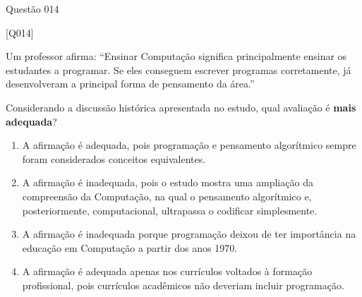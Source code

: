 \documentclass[xcolor=dvipsnames,table]{beamer}
\begin{document}
{\logo{}
\begin{frame}{Questão 014}

    \footnotesize

    \begin{block}{[Q014]}

    Um professor afirma: ``Ensinar Computação significa principalmente ensinar os estudantes a programar. Se eles conseguem escrever programas corretamente, já desenvolveram a principal forma de pensamento da área.''

    Considerando a discussão histórica apresentada no estudo, qual avaliação é \textbf{mais adequada}?

    \end{block}

    \begin{enumerate}[label=(\Alph*)]

        \item A afirmação é adequada, pois programação e pensamento algorítmico sempre foram considerados conceitos equivalentes.

        \item A afirmação é inadequada, pois o estudo mostra uma ampliação da compreensão da Computação, na qual o pensamento algorítmico e, posteriormente, computacional, ultrapassa o codificar simplesmente.

        \item A afirmação é inadequada porque programação deixou de ter importância na educação em Computação a partir dos anos 1970.

        \item A afirmação é adequada apenas nos currículos voltados à formação profissional, pois currículos acadêmicos não deveriam incluir programação.

    \end{enumerate}

\end{frame}
}
\end{document}
